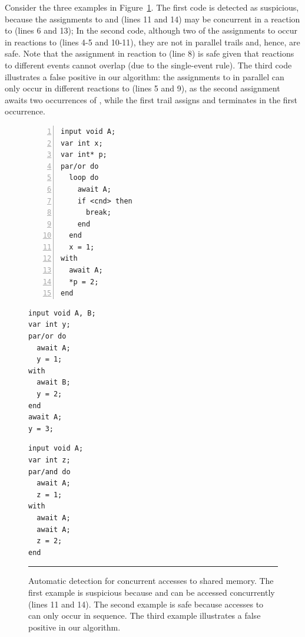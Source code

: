 Consider the three examples in Figure~\ref{lst.det}.
The first code is detected as suspicious, because the assignments to  
and  (lines 11 and 14) may be concurrent in a reaction to  
(lines 6 and 13);
%
In the second code, although two of the assignments to  occur in 
reactions to  (lines 4-5 and 10-11), they are not in parallel trails 
and, hence, are safe.
Note that the assignment in reaction to  (line 8) is safe given that 
reactions to different events cannot overlap (due to the single-event rule).
%
The third code illustrates a false positive in our algorithm: the assignments 
to  in parallel can only occur in different reactions to  
(lines 5 and 9), as the second assignment awaits two occurrences of , 
while the first trail assigns and terminates in the first occurrence.

\begin{figure}[t]
\begin{minipage}[t]{0.39\linewidth}
\begin{lstlisting}[numbers=left,xleftmargin=2em]
input void A;
var int x;
var int* p;
par/or do
  loop do
    await A;
    if <cnd> then
      break;
    end
  end
  x = 1;
with
  await A;
  *p = 2;
end

\end{lstlisting}
\end{minipage}
%
%
\begin{minipage}[t]{0.33\linewidth}
\begin{lstlisting}
input void A, B;
var int y;
par/or do
  await A;
  y = 1;
with
  await B;
  y = 2;
end
await A;
y = 3;

\end{lstlisting}
\end{minipage}
%
%
\begin{minipage}[t]{0.25\linewidth}
\begin{lstlisting}
input void A;
var int z;
par/and do
  await A;
  z = 1;
with
  await A;
  await A;
  z = 2;
end
\end{lstlisting}
\end{minipage}
%
\rule{14cm}{0.37pt}
\caption{ Automatic detection for concurrent accesses to shared memory. \newline
{\small %
The first example is suspicious because  and  can be accessed 
concurrently (lines 11 and 14).
The second example is safe because accesses to  can only occur in 
sequence.
The third example illustrates a false positive in our algorithm.
}%
\label{lst.det}
}
\end{figure}

